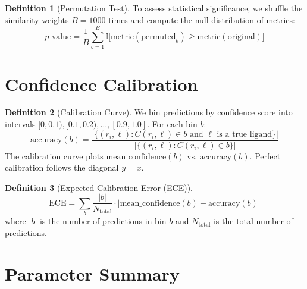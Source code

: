 \documentclass[12pt,oneside]{article}
\theoremstyle{definition}
\newtheorem{definition}{Definition}[section]
\begin{document}
\begin{definition}[Permutation Test]
To assess statistical significance, we shuffle the similarity weights $B = 1000$ times and compute the null distribution of metrics:
\begin{equation}
p\text{-value} = \frac{1}{B} \sum_{b=1}^{B} \mathbb{I}\bigl[\text{metric}(\text{permuted}_b) \geq \text{metric}(\text{original})\bigr]
\label{eq:permutation}
\end{equation}
\end{definition}

\section{Confidence Calibration}

\begin{definition}[Calibration Curve]
We bin predictions by confidence score into intervals $[0, 0.1), [0.1, 0.2), \ldots, [0.9, 1.0]$. For each bin $b$:
\begin{equation}
\text{accuracy}(b) = \frac{|\{(r_i, \ell) : C(r_i, \ell) \in b \text{ and } \ell \text{ is a true ligand}\}|}{|\{(r_i, \ell) : C(r_i, \ell) \in b\}|}
\label{eq:calibration}
\end{equation}
The calibration curve plots $\text{mean confidence}(b)$ vs. $\text{accuracy}(b)$. Perfect calibration follows the diagonal $y = x$.
\end{definition}

\begin{definition}[Expected Calibration Error (ECE)]
\begin{equation}
\text{ECE} = \sum_{b} \frac{|b|}{N_{\text{total}}} \cdot \bigl|\text{mean\_confidence}(b) - \text{accuracy}(b)\bigr|
\label{eq:ece}
\end{equation}
where $|b|$ is the number of predictions in bin $b$ and $N_{\text{total}}$ is the total number of predictions.
\end{definition}

\section{Parameter Summary}
\end{document}
